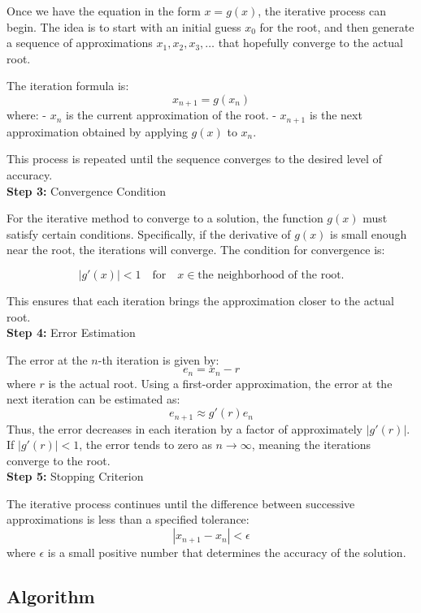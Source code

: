 \documentclass[12pt,a4paper]{article}
\begin{document}
	Once we have the equation in the form \( x = g(x) \), the iterative process can begin. The idea is to start with an initial guess \( x_0 \) for the root, and then generate a sequence of approximations \( x_1, x_2, x_3, \dots \) that hopefully converge to the actual root.
	
	The iteration formula is:
	\[
	x_{n+1} = g(x_n)
	\]
	where:
	- \( x_n \) is the current approximation of the root.
	- \( x_{n+1} \) is the next approximation obtained by applying \( g(x) \) to \( x_n \).
	
	This process is repeated until the sequence converges to the desired level of accuracy.\\
	
	\textbf{Step 3:} Convergence Condition
	
	For the iterative method to converge to a solution, the function \( g(x) \) must satisfy certain conditions. Specifically, if the derivative of \( g(x) \) is small enough near the root, the iterations will converge. The condition for convergence is:
	
	\[
	|g'(x)| < 1 \quad \text{for} \quad x \in \text{the neighborhood of the root}.
	\]
	
	This ensures that each iteration brings the approximation closer to the actual root.\\
	
	\textbf{Step 4:} Error Estimation
	
	The error at the \(n\)-th iteration is given by:
	\[
	e_n = x_n - r
	\]
	where \( r \) is the actual root. Using a first-order approximation, the error at the next iteration can be estimated as:
	\[
	e_{n+1} \approx g'(r) e_n
	\]
	Thus, the error decreases in each iteration by a factor of approximately \( |g'(r)| \). If \( |g'(r)| < 1 \), the error tends to zero as \( n \to \infty \), meaning the iterations converge to the root.\\
	
	\textbf{Step 5:} Stopping Criterion
	
	The iterative process continues until the difference between successive approximations is less than a specified tolerance:
	\[
	|x_{n+1} - x_n| < \epsilon
	\]
	where \( \epsilon \) is a small positive number that determines the accuracy of the solution.
	
	
	
	
	
	\subsection{Algorithm}
	
\end{document}
